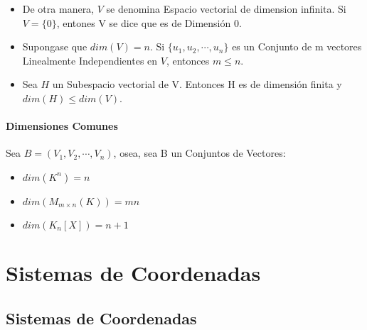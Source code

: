 \documentclass[12pt]{report}							    %
\begin{document}
        \begin{itemize}
            \item De otra manera, $V$ se denomina Espacio vectorial de dimension infinita.
            Si $V=\{0\}$, entones V se dice que es de Dimensión 0.

            \item Supongase que $dim(V) = n$. Si $\{u_1, u_2, \cdots, u_n\}$ es un Conjunto de m vectores
            Linealmente Independientes en $V$, entonces $m \leq n$.

            \item Sea $H$ un Subespacio vectorial de V. Entonces H es de dimensión finita
            y $dim(H) \leq dim(V)$.

        \end{itemize}


        \subsubsection{Dimensiones Comunes}
        Sea $ B = (V_1, V_2, \cdots, V_n)$, osea, sea B un Conjuntos de Vectores:

        \begin{itemize}
            \item $dim(K^n) = n$
            \item $dim(M_{m \times n}(K)) = mn$
            \item $dim(K_{n}{[X]}) = n + 1$
        \end{itemize}


\chapter{Sistemas de Coordenadas}
    \clearpage

    \section{Sistemas de Coordenadas}
\end{document}
